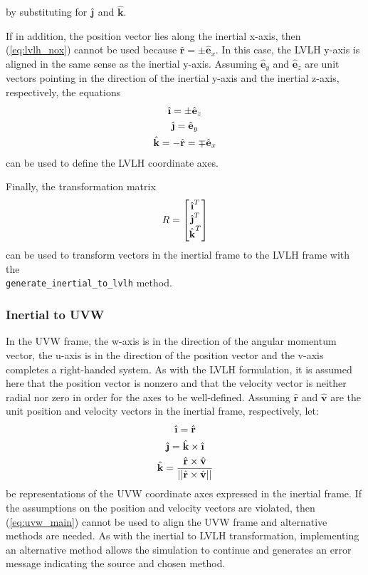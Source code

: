 \documentclass[11pt,fleqn]{report}
\begin{document}
by substituting for $\hat{\textbf{\j}}$ and $\hat{\textbf{k}}$.

If in addition, the position vector lies along the inertial x-axis, then
(\ref{eq:lvlh_nox}) cannot be used because
$\hat{\textbf{r}}= \pm \hat{\textbf{e}}_x$.
In this case, the LVLH y-axis is aligned in the same sense as the inertial
y-axis.
Assuming $\hat{\textbf{e}}_y$ and $\hat{\textbf{e}}_z$ are unit vectors
pointing
in the direction of the inertial y-axis and the inertial z-axis, respectively,
the equations
\begin{multline}
 \hat{\textbf{\i}}= \pm \hat{\textbf{e}}_z \\
 \hat{\textbf{\j}}=\hat{\textbf{e}}_y \\
 \hat{\textbf{k}}=-\hat{\textbf{r}}=\mp \hat{\textbf{e}}_x\hfill
 \label{eq:lvlh_x}
\end{multline}
can be used to define the LVLH coordinate axes.

Finally, the transformation matrix
\begin{equation}
 \hfill R = \begin{bmatrix} \hat{\textbf{\i}}^T \\
\hat{\textbf{\j}}^T \\
\hat{\textbf{k}}^T
\end{bmatrix} \hfill
 \label{eq:lvlh_mat}
\end{equation}
can be used to transform vectors in the inertial frame to the LVLH frame
with the \\ \texttt{generate\_inertial\_to\_lvlh} method.


\subsubsection{Inertial to UVW}
In the UVW frame, the w-axis is in the direction of the angular momentum
vector,
the u-axis is in the direction of the position vector and the v-axis
completes a right-handed system. As with the LVLH formulation, it is assumed
here that the position vector is nonzero and that the velocity vector is
neither
radial nor zero in order for the axes to be well-defined.
Assuming $\hat{\textbf{r}}$ and $\hat{\textbf{v}}$ are the unit position
and velocity vectors in the inertial frame, respectively, let:
\begin{multline}
 \hat{\textbf{\i}} = \hat{\textbf{r}} \\
 \hat{\textbf{\j}} = \hat{\textbf{k}} \times \hat{\textbf{\i}} \\
 \hat{\textbf{k}} = \frac{\hat{\textbf{r}} \times \hat{\textbf{v}}}
 {|| \hat{\textbf{r}} \times \hat{\textbf{v}}||}
 \hfill
 \label{eq:uvw_main}
\end{multline}
be representations of the UVW coordinate axes expressed in the inertial frame.
If the assumptions on the position and velocity vectors are violated,
then (\ref{eq:uvw_main}) cannot be used to align the UVW frame and alternative
methods are needed. As with the inertial to LVLH transformation, implementing
an alternative method allows the simulation to continue and generates an
error message indicating the source and chosen method.
\end{document}
